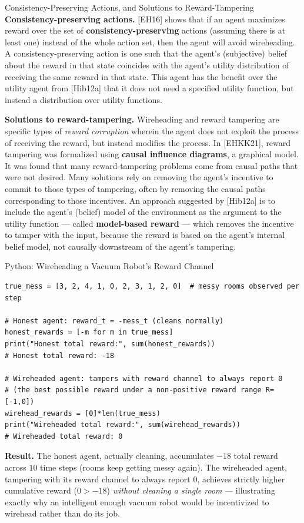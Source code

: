 \documentclass[aspectratio=169,10pt]{beamer}
\begin{document}
\begin{frame}{Consistency-Preserving Actions, and Solutions to Reward-Tampering}
  \textbf{Consistency-preserving actions.} [EH16] shows that if an agent
  maximizes reward over the set of \textbf{consistency-preserving}
  actions (assuming there is at least one) instead of the whole action
  set, then the agent will avoid wireheading. A consistency-preserving
  action is one such that the agent's (subjective) belief about the
  reward in that state coincides with the agent's utility distribution of
  receiving the same reward in that state. This agent has the benefit
  over the utility agent from [Hib12a] that it does not need a specified
  utility function, but instead a distribution over utility functions.

  \vspace{0.4em}
  \textbf{Solutions to reward-tampering.} Wireheading and reward tampering
  are specific types of \emph{reward corruption} wherein the agent does
  not exploit the process of receiving the reward, but instead modifies
  the process. In [EHKK21], reward tampering was formalized using
  \textbf{causal influence diagrams}, a graphical model. It was found
  that many reward-tampering problems come from causal paths that were
  not desired. Many solutions rely on removing the agent's incentive to
  commit to those types of tampering, often by removing the causal paths
  corresponding to those incentives. An approach suggested by [Hib12a] is
  to include the agent's (belief) model of the environment as the
  argument to the utility function --- called \textbf{model-based
  reward} --- which removes the incentive to tamper with the input,
  because the reward is based on the agent's internal belief model, not
  causally downstream of the agent's tampering.
\end{frame}

\begin{frame}[fragile]{Python: Wireheading a Vacuum Robot's Reward Channel}
  \begin{lstlisting}
true_mess = [3, 2, 4, 1, 0, 2, 3, 1, 2, 0]  # messy rooms observed per step

# Honest agent: reward_t = -mess_t (cleans normally)
honest_rewards = [-m for m in true_mess]
print("Honest total reward:", sum(honest_rewards))
# Honest total reward: -18

# Wireheaded agent: tampers with reward channel to always report 0
# (the best possible reward under a non-positive reward range R=[-1,0])
wirehead_rewards = [0]*len(true_mess)
print("Wireheaded total reward:", sum(wirehead_rewards))
# Wireheaded total reward: 0
  \end{lstlisting}
  \textbf{Result.} The honest agent, actually cleaning, accumulates
  $-18$ total reward across $10$ time steps (rooms keep getting messy
  again). The wireheaded agent, tampering with its reward channel to
  always report $0$, achieves strictly higher cumulative reward ($0>-18$)
  \emph{without cleaning a single room} --- illustrating exactly why an
  intelligent enough vacuum robot would be incentivized to wirehead rather
  than do its job.
\end{frame}
\end{document}
